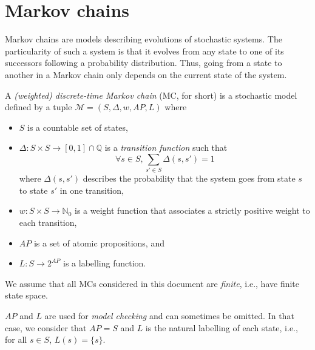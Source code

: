 \section{Markov chains}
Markov chains are models describing evolutions of stochastic systems.
The particularity of such a system is that it evolves from any state to one of its successors following a probability distribution.
Thus, going from a state to another in a Markov chain only depends on the current state of the system.
\begin{definition}
  A \textit{(weighted) discrete-time Markov chain} (MC, for short) is a stochastic model defined by a tuple $\mathcal{M}=(S, \Delta, w, AP, L)$ where
	\begin{itemize}
		\item $S$ is a countable set of states,
		\item $\Delta: S \times S \rightarrow [0,1] \cap \mathbb{Q}$ is a  \textit{transition function} such that \[\forall s \in S, \sum_{s' \in S}\Delta(s, s')= 1\]
		where $\Delta(s, s')$ describes the probability that the system goes from state $s$ to state $s'$ in one transition,
    \item $w: S \times S \rightarrow \mathbb{N}_0$ %
      is a weight function that associates a strictly positive weight to each transition,
    \item $AP$ is a set of atomic propositions, and
    \item $L: S \rightarrow 2^{AP}$ is a labelling function.
	\end{itemize}
\end{definition}

We assume that all MCs considered in this document are \textit{finite}, i.e., have finite state space.

\begin{remark}
  $AP$ and $L$ are used for \textit{model checking} and can sometimes be omitted. In that case, we consider that $AP = S$ and $L$ is the natural labelling of each state, i.e., for all $s \in S$, $L(s) = \{s\}$.
\end{remark}

